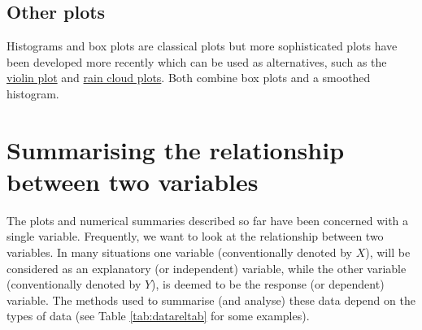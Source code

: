 \documentclass[
  oneside]{krantz}
\begin{document}
\hypertarget{other-plots}{%
\subsection{Other plots}\label{other-plots}}

Histograms and box plots are classical plots but more sophisticated plots have been developed more recently which can be used as alternatives, such as the \href{https://mode.com/blog/violin-plot-examples/}{violin plot} and \href{https://micahallen.org/2018/03/15/introducing-raincloud-plots/}{rain cloud plots}. Both combine box plots and a smoothed histogram.

\hypertarget{summarising-the-relationship-between-two-variables}{%
\section{Summarising the relationship between two variables}\label{summarising-the-relationship-between-two-variables}}

The plots and numerical summaries described so far have been concerned with a single variable. Frequently, we want to look at the relationship between two variables. In many situations one variable (conventionally denoted by \(X\)), will be considered as an explanatory (or independent) variable, while the other variable (conventionally denoted by \(Y\)), is deemed to be the response (or dependent) variable. The methods used to summarise (and analyse) these data depend on the types of data (see Table \ref{tab:datareltab} for some examples).
\end{document}
